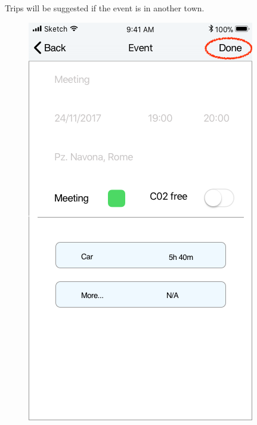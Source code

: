\newpage
{}
Trips will be suggested if the event is in another town.
\begin{figure}[H]
	\centering
	\includegraphics[scale=0.23]{Images/Interface/Trips/1_event_in_rome}
	\hspace{0.5cm}

\end{figure}
